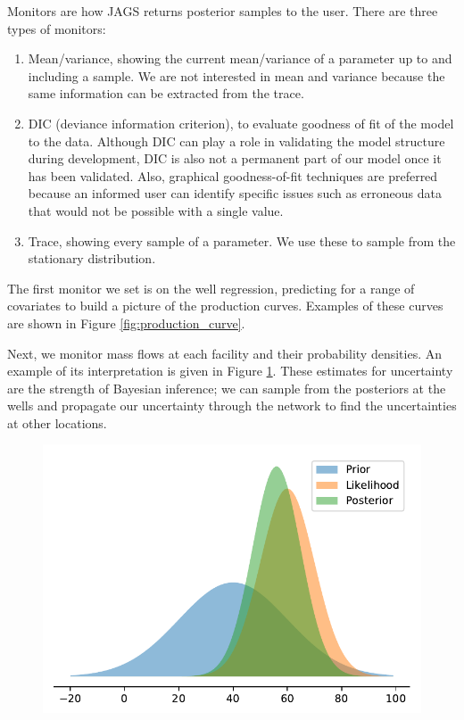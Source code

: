 \documentclass[a4paper, 12pt]{article}
\begin{document}
Monitors are how JAGS returns posterior samples to the user. There are three types of monitors:

\begin{enumerate}
\item Mean/variance, showing the current mean/variance of a parameter up to and including a sample. We are not interested in mean and variance because the same information can be extracted from the trace.
\item DIC (deviance information criterion), to evaluate goodness of fit of the model to the data. Although DIC can play a role in validating the model structure during development, DIC is also not a permanent part of our model once it has been validated. Also, graphical goodness-of-fit techniques are preferred because an informed user can identify specific issues such as erroneous data that would not be possible with a single value.
\item Trace, showing every sample of a parameter. We use these to sample from the stationary distribution.
\end{enumerate}

The first monitor we set is on the well regression, predicting for a range of covariates to build a picture of the production curves. Examples of these curves are shown in Figure \ref{fig:production_curve}.

Next, we monitor mass flows at each facility and their probability densities. An example of its interpretation is given in Figure \ref{fig:bayesdemo}. These estimates for uncertainty are the strength of Bayesian inference; we can sample from the posteriors at the wells and propagate our uncertainty through the network to find the uncertainties at other locations.

\begin{figure}
\centering
  \includegraphics[width=0.5\linewidth]{media/bayesdemo}
  \label{fig:bayesdemo}
\end{figure}
\end{document}

